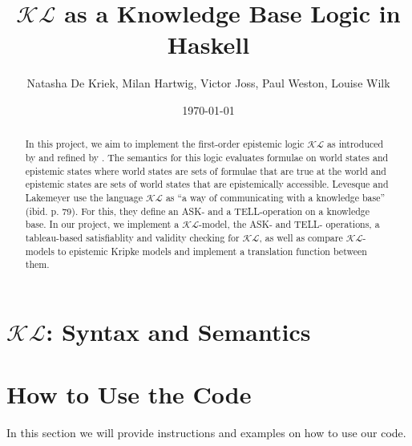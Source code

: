 \documentclass[12pt,a4paper]{article}
\title{$\mathcal{KL}$ as a Knowledge Base Logic in Haskell}
\author{Natasha De Kriek, Milan Hartwig, Victor Joss, Paul Weston, Louise Wilk}
\date{\today}
\begin{document}
\maketitle

\begin{abstract}
In this project, we aim to implement the first-order epistemic logic $\mathcal{KL}$ as introduced by \textcite{levesque1981} and refined by \textcite{Lokb}. 
The semantics for this logic evaluates formulae on world states and epistemic states where world states are sets of formulae that are true at the world and epistemic states are sets of world states that are epistemically accessible. Levesque and Lakemeyer use the language $\mathcal{KL}$ as ``a way of communicating with a knowledge base'' (ibid. p. 79). For this, they define an ASK- and a TELL-operation on a knowledge base. In our project, we implement a  $\mathcal{KL}$-model, the ASK- and TELL- operations, a tableau-based satisfiablity and validity checking for  $\mathcal{KL}$, as well as compare  $\mathcal{KL}$-models to epistemic Kripke models and implement a translation function between them.
\end{abstract}


\tableofcontents

\clearpage



\section{\texorpdfstring{$\mathcal{KL}$}{KL}: Syntax and Semantics}\label{sec:KLmodel}








% 



% 

\section{How to Use the Code}

In this section we will provide instructions and examples on how to use our code.
\end{document}
